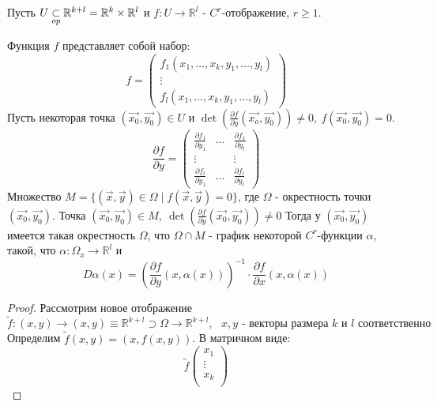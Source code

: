 \begin{theorem}
    Пусть $U \underset{op}{\subset} \mathbb{R}^{k+l} = \mathbb{R}^k \times \mathbb{R}^l$ и $f: U \to \mathbb{R}^l$ - $C^r$-отображение, $r \geq 1$.

    Функция $f$ представляет собой набор:
    \[f = \begin{pmatrix}{}
        f_1(x_1, \hdots, x_k, y_1, \hdots, y_l) \\
        \vdots \\
        f_l(x_1, \hdots, x_k, y_1, \hdots, y_l)
    \end{pmatrix}\]
    Пусть некоторая точка $(\overrightarrow{x_0}, \overrightarrow{y_0}) \in U$ и $\det(\frac{\partial f}{\partial y}(\overrightarrow{x_o}, \overrightarrow{y_0})) \neq 0, \ f(\overrightarrow{x_0}, \overrightarrow{y_0}) = 0$.
    \[\frac{\partial f}{\partial y} = \begin{pmatrix}
        \frac{\partial f_1}{\partial y_1} & \hdots & \frac{\partial f_1}{\partial y_l} \\
        \vdots & & \vdots \\
        \frac{\partial f_l}{\partial y_1} & \hdots & \frac{\partial f_l}{\partial y_l}
    \end{pmatrix}\]
    Множество $M = \{(\overrightarrow{x},\overrightarrow{y}) \in \Omega \mid f(\overrightarrow{x}, \overrightarrow{y}) = 0\}$, где $\Omega$ - окрестность точки $(\overrightarrow{x_0}, \overrightarrow{y_0})$.
    Точка $(\overrightarrow{x_0}, \overrightarrow{y_0}) \in M, \ \det(\frac{\partial f}{\partial y}(\overrightarrow{x_0}, \overrightarrow{y_0})) \neq 0$
    \newline
    Тогда у $(\overrightarrow{x_0}, \overrightarrow{y_0})$ имеется такая окрестность $\Omega$, что $\Omega \cap M$ - график некоторой $C^r$-функции $\alpha$, такой, что $\alpha: \Omega_x \to \mathbb{R}^l$ и 
    \[D\alpha(x) = (\frac{\partial f}{\partial y}(x, \alpha(x)))^{-1} \cdot \frac{\partial f}{\partial x}(x, \alpha(x))\]
    \newpage
    \begin{proof}
        Рассмотрим новое отображение 
        \[\tilde{f}: (x, y) \to (x, y) \equiv \mathbb{R}^{k+l} \supset \Omega \to \mathbb{R}^{k+l}, \text{ $x, y$ - векторы размера $k$ и $l$ соответственно}\]
        Определим $\tilde{f}(x, y) = (x, f(x, y))$.
        В матричном виде:
        \[\tilde{f}\begin{pmatrix}
            x_1 \\ \vdots \\ x_k \\

\end{pmatrix}\]
\end{proof}
\end{theorem}

